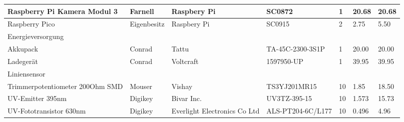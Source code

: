 \documentclass[main.tex]{subfiles} %
\begin{document}
\begin{table}[htbp]
{\begin{tabular}{|p{3cm}|p{2.5cm}|p{2.5cm}|p{3cm}|p{1cm}|p{1.5cm}|p{1cm}|}
            Raspberry Pi Kamera Modul 3             & Farnell            & Raspbery Pi                  & SC0872                  & 1               & 20.68                     & 20.68                       \\ \hline
            Raspberry Pico                          & Eigenbesitz        & Raspbery Pi                  & SC0915                  & 2               & 2.75                      & 5.50                        \\ \hline
            \rowcolor{lightgray} Energieversorgung  &                    &                              &                         &                 &                           &                                 \\ \hline
            Akkupack                                & Conrad             & Tattu                        & TA-45C-2300-3S1P        & 1               & 20.00                     & 20.00                        \\ \hline
            Ladegerät                               & Conrad             & Voltcraft                    & 1597950-UP              & 1               & 39.95                     & 39.95                           \\ \hline
            \rowcolor{lightgray} Liniensensor       &                    &                              &                         &                 &                           &                             \\ \hline
            Trimmerpotentiometer 200Ohm SMD         & Mouser             & Vishay                       & TS3YJ201MR15            & 10              & 1.85                      & 18.50                        \\ \hline
            UV-Emitter 395nm                        & Digikey            & Bivar Inc.                   & UV3TZ-395-15            & 10              & 1.573                     & 15.73                       \\ \hline
            UV-Fototransistor 630nm                 & Digikey            & Everlight Electronics Co Ltd & ALS-PT204-6C/L177       & 10              & 0.496                     & 4.96                        \\ \hline

\end{tabular}}
\end{table}
\end{document}
